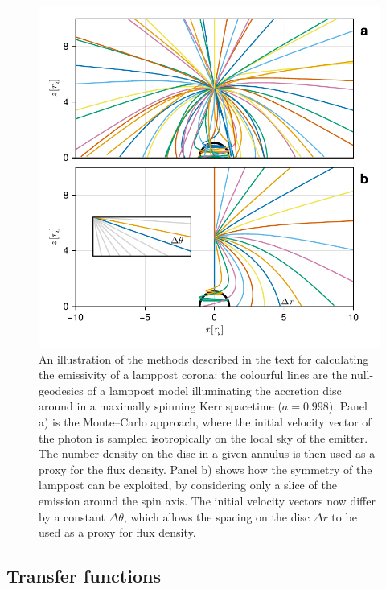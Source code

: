 \documentclass[fleqn,usenatbib]{mnras}
\begin{document}
\begin{figure}
    \centering
    \includegraphics[width=0.95\columnwidth]{figures/emissivity.coronal-traces.pdf}
    \caption{An illustration of the methods described in the text for
        calculating the emissivity of a lamppost corona: the colourful lines are
        the null-geodesics of a lamppost model illuminating the accretion disc
        around in a maximally spinning Kerr spacetime ($a = 0.998$). Panel a) is
        the Monte--Carlo approach, where the initial velocity vector of the
        photon is sampled isotropically on the local sky of the emitter. The
        number density on the disc in a given annulus is then used as a proxy
        for the flux density. Panel b) shows how the symmetry of the lamppost can
        be exploited, by considering only a slice of the emission around the
        spin axis. The initial velocity vectors now differ by a constant $\Delta
    \theta$, which allows the spacing on the disc $\Delta r$ to be used as a
proxy for flux density.}
    \label{fig:coronal-tracing}
\end{figure}

\subsection{Transfer functions}
\label{sec:transfer-functions}
\end{document}

